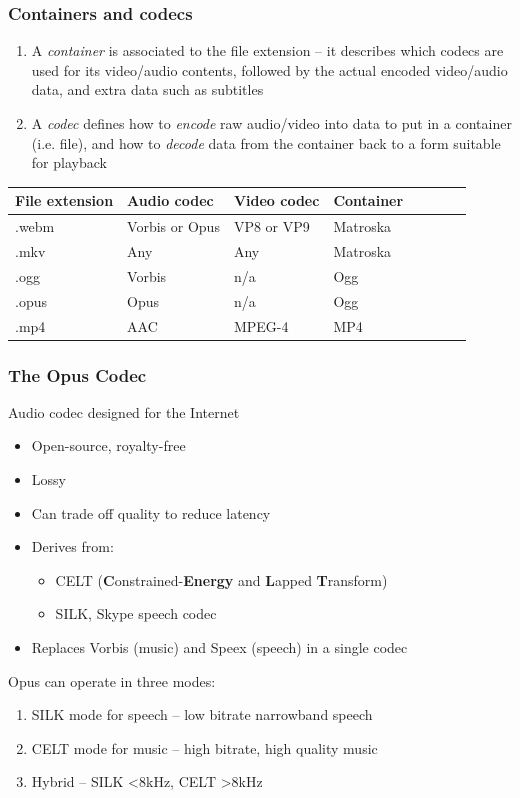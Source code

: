 \documentclass{beamer}
\begin{document}
\begin{frame}
	\frametitle{Containers and codecs}
	\begin{enumerate}
		\item
			A \textit{container} is associated to the file extension -- it describes which codecs are used for its video/audio contents, followed by the actual encoded video/audio data, and extra data such as subtitles
		\item
			A \textit{codec} defines how to \textit{encode} raw audio/video into data to put in a container (i.e. file), and how to \textit{decode} data from the container back to a form suitable for playback
	\end{enumerate}
	\begin{table}[ht]
	\centering
	\begin{tabular}{llll c c c c}
		\hline\hline
		File extension & Audio codec & Video codec & Container \\ [0.5ex]
		\hline\hline
		.webm & Vorbis or Opus & VP8 or VP9 & Matroska \\ [0.5ex]
		.mkv & Any & Any & Matroska \\ [0.5ex]
		.ogg & Vorbis & n/a & Ogg \\ [0.5ex]
		.opus & Opus & n/a & Ogg \\ [0.5ex]
		.mp4 & AAC & MPEG-4 & MP4 \\ [0.5ex]
		\hline
	\end{tabular}
	\end{table}
\end{frame}

\begin{frame}
	\frametitle{The Opus Codec}
	Audio codec designed for the Internet
	\begin{itemize}
		\item
			Open-source, royalty-free
		\item
			Lossy
		\item
			Can trade off quality to reduce latency
		\item
			Derives from:
			\begin{itemize}
				\item
					CELT (\textbf{C}onstrained-\textbf{Energy} and \textbf{L}apped \textbf{T}ransform)
				\item
					SILK, Skype speech codec
			\end{itemize}
		\item
			Replaces Vorbis (music) and Speex (speech) in a single codec
	\end{itemize}
	Opus can operate in three modes:
	\begin{enumerate}
		\item
			SILK mode for speech -- low bitrate narrowband speech
		\item
			CELT mode for music -- high bitrate, high quality music
		\item
			Hybrid -- SILK <8kHz, CELT >8kHz
	\end{enumerate}
\end{frame}
\end{document}
